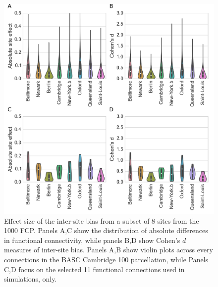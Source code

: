 \documentclass[authoryear]{elsarticle}
\begin{document}

\begin{figure}[htbp]
\begin{center}
\includegraphics[width=0.8\linewidth]{../figures/effect_distribution.png}
\end{center}
\caption[inter site variability]{
Effect size of the inter-site bias from a subset of 8 sites from the 1000 FCP. Panels A,C show the distribution of absolute differences in functional connectivity, while panels B,D show Cohen's $d$ measures of inter-site bias. Panels A,B show violin plots across every connections in the BASC Cambridge 100 parcellation, while Panels C,D focus on the selected 11 functional connections used in simulations, only. 
}
\label{fig_site_variability}
\end{figure}
\end{document}
